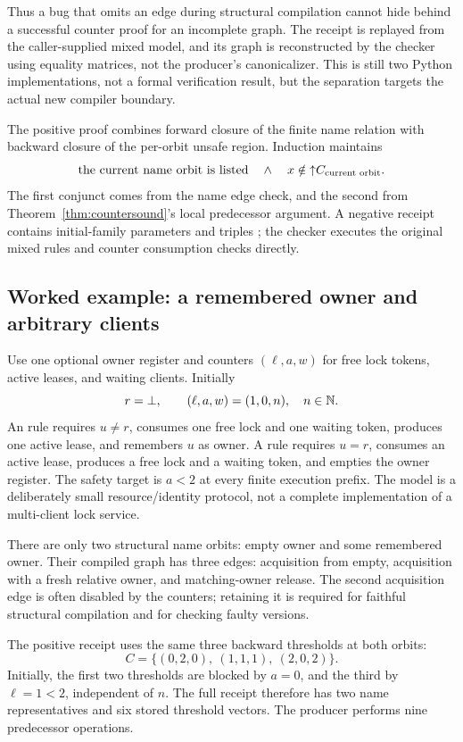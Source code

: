 Thus a bug that omits an edge during structural compilation cannot hide behind
a successful counter proof for an incomplete graph. The receipt is replayed
from the caller-supplied mixed model, and its graph is reconstructed by the
checker using equality matrices, not the producer's canonicalizer. This is
still two Python implementations, not a formal verification result, but the
separation targets the actual new compiler boundary.

The positive proof combines forward closure of the finite name relation with
backward closure of the per-orbit unsafe region. Induction maintains
\[
 \text{the current name orbit is listed}\quad\land\quad
 x\notin\mathord{\uparrow}C_{\text{current orbit}}.
\]
The first conjunct comes from the name edge check, and the second from
Theorem~\ref{thm:countersound}'s local predecessor argument. A negative receipt
contains initial-family parameters and triples
; the checker executes the original mixed
rules and counter consumption checks directly.

\subsection{Worked example: a remembered owner and arbitrary clients}
Use one optional owner register and counters $(\ell,a,w)$ for free lock tokens,
active leases, and waiting clients. Initially
\[
 r=\bot,\qquad (\ell,a,w)=(1,0,n),\quad n\in\mathbb N.
\]
An  rule requires $u\ne r$, consumes one free lock and one
waiting token, produces one active lease, and remembers $u$ as owner.
A  rule requires $u=r$, consumes an active lease, produces a
free lock and a waiting token, and empties the owner register. The safety target
is $a<2$ at every finite execution prefix. The model is a deliberately small
resource/identity protocol, not a complete implementation of a multi-client
lock service.

There are only two structural name orbits: empty owner and some remembered
owner. Their compiled graph has three edges: acquisition from empty,
acquisition with a fresh relative owner, and matching-owner release. The second
acquisition edge is often disabled by the counters; retaining it is required
for faithful structural compilation and for checking faulty versions.

The positive receipt uses the same three backward thresholds at both orbits:
\[
 C=\{(0,2,0),\ (1,1,1),\ (2,0,2)\}.
\]
Initially, the first two thresholds are blocked by $a=0$, and the third by
$\ell=1<2$, independent of $n$. The full receipt therefore has two name
representatives and six stored threshold vectors. The producer performs nine
predecessor operations.

